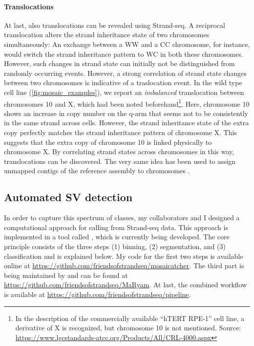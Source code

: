 \paragraph{Translocations}
At last, also translocations can be revealed using Strand-seq.  A reciprocal
translocation alters the strand inheritance state of two chromosomes
simultaneously: An exchange between a WW and a CC chromosome, for instance, would switch the
strand inheritance pattern to WC in both these chromosomes. However, such
changes in strand state can initially not be distinguished from randomly
occurring \sce events. However, a strong correlation of strand state changes
between two chromosomes is indicative of a traslocation event. In the \rpe wild
type cell line (\cref{fig:mosaic_examples}), we report an \emph{imbalanced}
translocation between chromosomes 10 and X, which had been noted
beforehand\footnote{In the description of the commercially available
    ``hTERT RPE-1'' cell line, a derivative of X is recognized, but chromosome
    10 is not mentioned. Source: \url{https://www.lgcstandards-atcc.org/Products/All/CRL-4000.aspx}}.
Here, chromosome 10 shows an increase in copy number on the q-arm that seems not
to be consistently in the same strand across cells. However, the strand
inheritance state of the extra copy perfectly matches the strand inheritance
pattern of chromosome X. This suggests that the extra copy of chromosome 10 is
linked physically to chromosome X. By correlating strand states across
chromosomes in this way, translocations can be discovered. The very same idea
has been used to assign unmapped contigs of the reference assembly to
chromosomes \citep{Hills2013}.







\FloatBarrier
\subsection{Automated SV detection}
\label{sec:mosaic_method}

In order to capture this spectrum of \sv classes, my collaborators and I
designed a computational approach for \sv calling from Strand-seq data.
This approach is implemented in a tool called \mc, which is currently being
developed. The core principle consists of the three steps (1) binning, (2)
segmentation, and (3) classification and is explained below. My code for the
first two steps is available online at
\url{https://github.com/friendsofstrandseq/mosaicatcher}.
The third part is being maintained by \maryam and can be found at
\url{https://github.com/friendsofstrandseq/MaRyam}. At last, the combined
workflow is available at \url{https://github.com/friendsofstrandseq/pipeline}.

